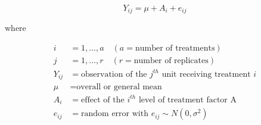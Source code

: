 \documentclass[
  letterpaper,
]{book}
\begin{document}
\[
Y_{ij} = \mu + A_{i} + e_{ij}
\]

where

\begin{equation}
\begin{aligned}
i & = 1, \dots, a \quad (a = \text{number of treatments}) \\
j & = 1, \dots, r \quad (r = \text{number of replicates}) \\
Y_{ij} & = \text{observation of the } j^{th} \text{ unit receiving treatment } i \\
\mu & = \text{overall or general mean} \\
A_i & = \text{effect of the } i^{th} \text{ level of treatment factor A} \\
e_{ij} & = \text{random error with } e_{ij} \sim N(0, \sigma^2)
\end{aligned}
\end{equation}
\end{document}
